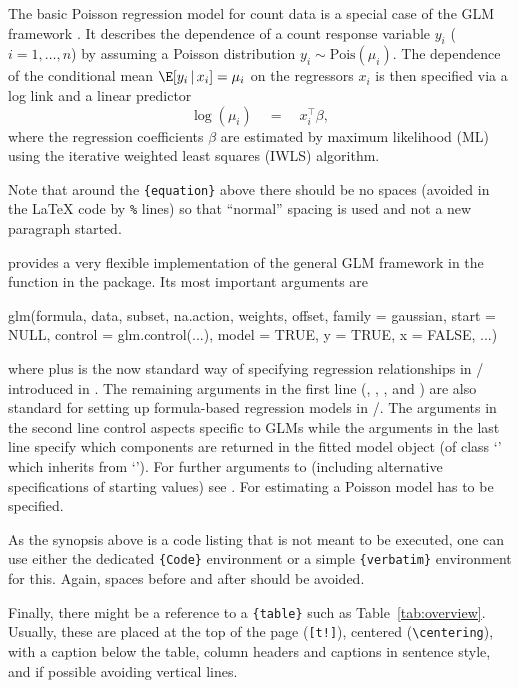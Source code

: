 \documentclass[article]{jss}
\newcommand{\class}[1]{`\code{#1}'}
\newcommand{\fct}[1]{\code{#1()}}
\begin{document}
The basic Poisson regression model for count data is a special case of the GLM
framework \cite{McCullagh+Nelder:1989}. It describes the dependence of a count
response variable $y_i$ ($i = 1, \dots, n$) by assuming a Poisson distribution
$y_i \sim \mathrm{Pois}(\mu_i)$. The dependence of the conditional mean
$\E[y_i \, | \, x_i] = \mu_i$ on the regressors $x_i$ is then specified via a
log link and a linear predictor
%
\begin{equation} \label{eq:mean}
\log(\mu_i) \quad = \quad x_i^\top \beta,
\end{equation}
%
where the regression coefficients $\beta$ are estimated by maximum likelihood
(ML) using the iterative weighted least squares (IWLS) algorithm.

\begin{leftbar}
Note that around the \verb|{equation}| above there should be no spaces (avoided
in the {\LaTeX} code by \verb|%| lines) so that ``normal'' spacing is used and
not a new paragraph started.
\end{leftbar}

 provides a very flexible implementation of the general GLM
framework in the function \fct{glm} \citep{Chambers+Hastie:1992} in the
 package. Its most important arguments are
\begin{Code}
glm(formula, data, subset, na.action, weights, offset,
  family = gaussian, start = NULL, control = glm.control(...),
  model = TRUE, y = TRUE, x = FALSE, ...)
\end{Code}
where  plus  is the now standard way of specifying
regression relationships in / introduced in
\cite{Chambers+Hastie:1992}. The remaining arguments in the first line
(, , , and ) are also
standard  for setting up formula-based regression models in
/. The arguments in the second line control aspects
specific to GLMs while the arguments in the last line specify which components
are returned in the fitted model object (of class \class{glm} which inherits
from \class{lm}). For further arguments to \fct{glm} (including alternative
specifications of starting values) see . For estimating a Poisson
model  has to be specified.

\begin{leftbar}
As the synopsis above is a code listing that is not meant to be executed,
one can use either the dedicated \verb|{Code}| environment or a simple
\verb|{verbatim}| environment for this. Again, spaces before and after should be
avoided.

Finally, there might be a reference to a \verb|{table}| such as
Table~\ref{tab:overview}. Usually, these are placed at the top of the page
(\verb|[t!]|), centered (\verb|\centering|), with a caption below the table,
column headers and captions in sentence style, and if possible avoiding vertical
lines.
\end{leftbar}
\end{document}
